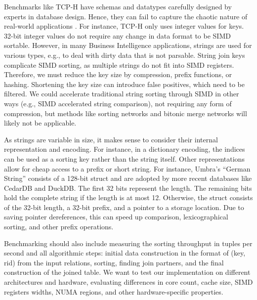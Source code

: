 Benchmarks like TCP-H have schemas and datatypes carefully designed by experts in database design.
Hence, they can fail to capture the chaotic nature of real-world applications \cite{10.1145/3209950.3209952}.
For instance, TCP-H only uses integer values for keys. 32-bit integer values do not require any change
in data format to be SIMD sortable. However, in many Business Intelligence applications, strings
are used for various types, e.g., to deal with dirty data that is not parsable. String join keys
complicate SIMD sorting, as multiple strings do not fit into SIMD registers. Therefore, we must
reduce the key size by compression, prefix functions, or hashing. Shortening the key size can
introduce false positives, which need to be filtered. We could accelerate traditional string
sorting through SIMD in other ways (e.g., SIMD accelerated string comparison), not requiring any
form of compression, but methods like sorting networks and bitonic merge networks will likely not
be applicable.

As strings are variable in size, it makes sense to consider their internal representation and
encoding. For instance, in a dictionary encoding, the indices can be used as a sorting key rather
than the string itself. Other representations allow for cheap access to a prefix or short string.
For instance, Umbra's ``German String'' \cite{DBLP:conf/cidr/NeumannF20} consists of a 128-bit 
struct and are adopted by more recent
databases like CedarDB and DuckDB. The first 32 bits represent the length. The remaining bits hold
the complete string if the length is at most 12. Otherwise, the struct consists of the 32-bit
length, a 32-bit prefix, and a pointer to a storage location. Due to saving pointer dereferences,
this can speed up comparison, lexicographical sorting, and other prefix operations.

Benchmarking should also include measuring the sorting throughput in tuples per second and all 
algorithmic steps: initial data construction in the format of (key, rid) from the input relations,
sorting, finding join partners, and the final construction of the joined table. 
We want to test our implementation on different architectures and hardware, evaluating
differences in core count, cache size, SIMD registers widths, NUMA regions, 
and other hardware-specific properties.
